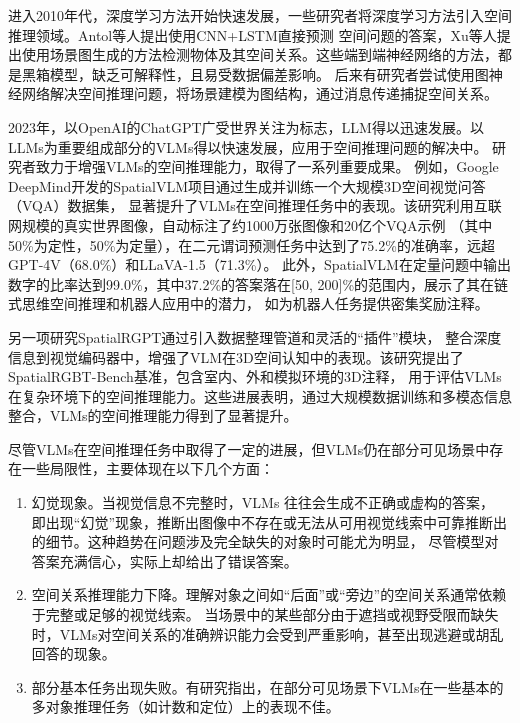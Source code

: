 进入2010年代，深度学习方法开始快速发展，一些研究者将深度学习方法引入空间推理领域。Antol等人\cite{Antol2015VQA}提出使用CNN+LSTM直接预测
空间问题的答案，Xu等人\cite{xu2017scene}提出使用场景图生成的方法检测物体及其空间关系。这些端到端神经网络的方法，都是黑箱模型，缺乏可解释性，且易受数据偏差影响。
后来有研究者尝试使用图神经网络解决空间推理问题，将场景建模为图结构，通过消息传递捕捉空间关系。

2023年，以OpenAI的ChatGPT广受世界关注为标志，LLM得以迅速发展。以LLMs为重要组成部分的VLMs得以快速发展，应用于空间推理问题的解决中。
研究者致力于增强VLMs的空间推理能力，取得了一系列重要成果。
例如，Google DeepMind开发的SpatialVLM\cite{chen2024spatialvlmendowingvisionlanguagemodels}项目通过生成并训练一个大规模3D空间视觉问答（VQA）数据集，
显著提升了VLMs在空间推理任务中的表现。该研究利用互联网规模的真实世界图像，自动标注了约1000万张图像和20亿个VQA示例
（其中50\%为定性，50\%为定量），在二元谓词预测任务中达到了75.2\%的准确率，远超GPT-4V（68.0\%）和LLaVA-1.5（71.3\%）。
此外，SpatialVLM在定量问题中输出数字的比率达到99.0\%，其中37.2\%的答案落在[50, 200]\%的范围内，展示了其在链式思维空间推理和机器人应用中的潜力，
如为机器人任务提供密集奖励注释。

另一项研究SpatialRGPT\cite{cheng2024spatialrgptgroundedspatialreasoning}通过引入数据整理管道和灵活的“插件”模块，
整合深度信息到视觉编码器中，增强了VLM在3D空间认知中的表现。该研究提出了SpatialRGBT-Bench基准，包含室内、外和模拟环境的3D注释，
用于评估VLMs在复杂环境下的空间推理能力。这些进展表明，通过大规模数据训练和多模态信息整合，VLMs的空间推理能力得到了显著提升。

尽管VLMs在空间推理任务中取得了一定的进展，但VLMs仍在部分可见场景中存在一些局限性，主要体现在以下几个方面：
\begin{enumerate}[nosep]
\item 幻觉现象。当视觉信息不完整时，VLMs 往往会生成不正确或虚构的答案，
即出现“幻觉”现象，推断出图像中不存在或无法从可用视觉线索中可靠推断出的细节。这种趋势在问题涉及完全缺失的对象时可能尤为明显，
尽管模型对答案充满信心，实际上却给出了错误答案\cite{vardi2025clipupclipbasedunanswerableproblem}。
\item 空间关系推理能力下降。理解对象之间如“后面”或“旁边”的空间关系通常依赖于完整或足够的视觉线索。
当场景中的某些部分由于遮挡或视野受限而缺失时，VLMs对空间关系的准确辨识能力会受到严重影响，甚至出现逃避或胡乱回答的现象\cite{chen2024spatialvlmendowingvisionlanguagemodels}。
\item 部分基本任务出现失败。有研究指出，在部分可见场景下VLMs在一些基本的多对象推理任务（如计数和定位）上的表现不佳\cite{campbell2024understandinglimitsvisionlanguage}。
\end{enumerate}

